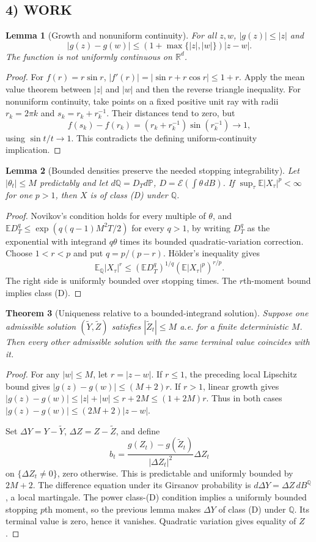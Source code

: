 \documentclass[11pt,a4paper]{article}
\newcommand{\R}{\mathbb R}
\newcommand{\E}{\mathbb E}
\newcommand{\Pp}{\mathbb P}
\newcommand{\Q}{\mathbb Q}
\newcommand{\cE}{\mathcal E}
\newtheorem{theorem}{Theorem}
\newtheorem{lemma}[theorem]{Lemma}
\theoremstyle{definition}
\begin{document}
\subsection*{4) WORK}
\begin{lemma}[Growth and nonuniform continuity]
For all $z,w$, $|g(z)|\le|z|$ and
\[
 |g(z)-g(w)|\le(1+\max\{|z|,|w|\})|z-w|.
\]
The function is not uniformly continuous on $\R^d$.
\end{lemma}
\begin{proof}
For $f(r)=r\sin r$, $|f'(r)|=|\sin r+r\cos r|\le1+r$. Apply the mean value theorem between $|z|$ and $|w|$ and then the reverse triangle inequality. For nonuniform continuity, take points on a fixed positive unit ray with radii
$r_k=2\pi k$ and $s_k=r_k+r_k^{-1}$. Their distances tend to zero, but
\[
 f(s_k)-f(r_k)=(r_k+r_k^{-1})\sin(r_k^{-1})\longrightarrow1,
\]
using $\sin t/t\to1$. This contradicts the defining uniform-continuity implication.
\end{proof}

\begin{lemma}[Bounded densities preserve the needed stopping integrability]
Let $|\theta_t|\le M$ predictably and let $d\Q=D_Td\Pp$, $D=\cE(\int\theta\,dB)$. If $\sup_\tau\E|X_\tau|^p<\infty$ for one $p>1$, then $X$ is of class (D) under $\Q$.
\end{lemma}
\begin{proof}
Novikov's condition holds for every multiple of $\theta$, and
$\E D_T^q\le\exp(q(q-1)M^2T/2)$ for every $q>1$, by writing $D_T^q$ as the exponential with integrand $q\theta$ times its bounded quadratic-variation correction. Choose $1<r<p$ and put $q=p/(p-r)$. H\"older's inequality gives
\[
 \E_\Q|X_\tau|^r\le
 (\E D_T^q)^{1/q}(\E|X_\tau|^p)^{r/p}.
\]
The right side is uniformly bounded over stopping times. The $r$th-moment bound implies class (D).
\end{proof}

\begin{theorem}[Uniqueness relative to a bounded-integrand solution]
Suppose one admissible solution $(\widetilde Y,\widetilde Z)$ satisfies
$|\widetilde Z_t|\le M$ a.e. for a finite deterministic $M$. Then every other admissible solution with the same terminal value coincides with it.
\end{theorem}
\begin{proof}
For any $|w|\le M$, let $r=|z-w|$. If $r\le1$, the preceding local Lipschitz bound gives
$|g(z)-g(w)|\le(M+2)r$.
If $r>1$, linear growth gives
$|g(z)-g(w)|\le|z|+|w|\le r+2M\le(1+2M)r$.
Thus in both cases
$|g(z)-g(w)|\le(2M+2)|z-w|$.

Set $\Delta Y=Y-\widetilde Y$, $\Delta Z=Z-\widetilde Z$, and define
\[
 b_t=\frac{g(Z_t)-g(\widetilde Z_t)}{|\Delta Z_t|^2}\Delta Z_t
\]
on $\{\Delta Z_t\ne0\}$, zero otherwise. This is predictable and uniformly bounded by $2M+2$. The difference equation under its Girsanov probability is $d\Delta Y=\Delta Z\,dB^\Q$, a local martingale. The power class-(D) condition implies a uniformly bounded stopping $p$th moment, so the previous lemma makes $\Delta Y$ of class (D) under $\Q$. Its terminal value is zero, hence it vanishes. Quadratic variation gives equality of $Z$.
\end{proof}
\end{document}
